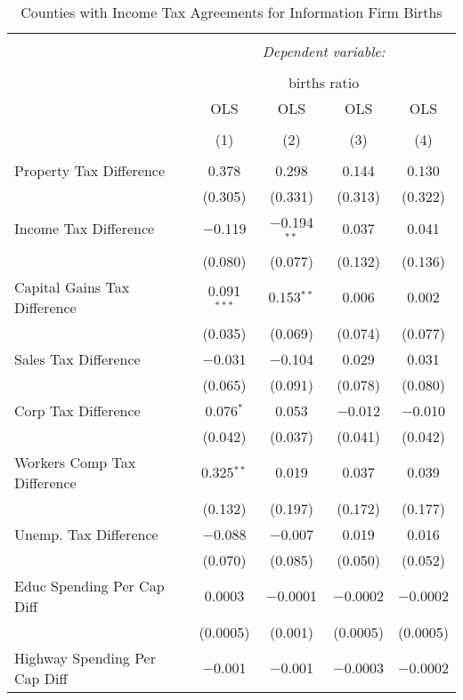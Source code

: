 
\begin{table}[!htbp] \centering 
  \caption{Counties with Income Tax Agreements for  Information Firm Births} 
  \label{51rd} 
\begin{tabular}{@{\extracolsep{5pt}}lcccc} 
\\[-1.8ex]\hline 
\hline \\[-1.8ex] 
 & \multicolumn{4}{c}{\textit{Dependent variable:}} \\ 
\cline{2-5} 
\\[-1.8ex] & \multicolumn{4}{c}{births ratio} \\ 
 & OLS & OLS & OLS & OLS \\ 
\\[-1.8ex] & (1) & (2) & (3) & (4)\\ 
\hline \\[-1.8ex] 
 Property Tax Difference & 0.378 & 0.298 & 0.144 & 0.130 \\ 
  & (0.305) & (0.331) & (0.313) & (0.322) \\ 
  Income Tax Difference & $-$0.119 & $-$0.194$^{**}$ & 0.037 & 0.041 \\ 
  & (0.080) & (0.077) & (0.132) & (0.136) \\ 
  Capital Gains Tax Difference & 0.091$^{***}$ & 0.153$^{**}$ & 0.006 & 0.002 \\ 
  & (0.035) & (0.069) & (0.074) & (0.077) \\ 
  Sales Tax Difference & $-$0.031 & $-$0.104 & 0.029 & 0.031 \\ 
  & (0.065) & (0.091) & (0.078) & (0.080) \\ 
  Corp Tax Difference & 0.076$^{*}$ & 0.053 & $-$0.012 & $-$0.010 \\ 
  & (0.042) & (0.037) & (0.041) & (0.042) \\ 
  Workers Comp Tax Difference & 0.325$^{**}$ & 0.019 & 0.037 & 0.039 \\ 
  & (0.132) & (0.197) & (0.172) & (0.177) \\ 
  Unemp. Tax Difference & $-$0.088 & $-$0.007 & 0.019 & 0.016 \\ 
  & (0.070) & (0.085) & (0.050) & (0.052) \\ 
  Educ Spending Per Cap Diff & 0.0003 & $-$0.0001 & $-$0.0002 & $-$0.0002 \\ 
  & (0.0005) & (0.001) & (0.0005) & (0.0005) \\ 
  Highway Spending Per Cap Diff & $-$0.001 & $-$0.001 & $-$0.0003 & $-$0.0002 \\ 

\end{tabular}
\end{table}
